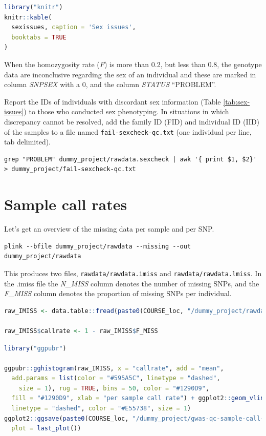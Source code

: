 \documentclass[
]{book}
\newcommand{\passthrough}[1]{#1}
\begin{document}
\begin{lstlisting}[language=R]
library("knitr")
knitr::kable(
  sexissues, caption = 'Sex issues',
  booktabs = TRUE
)
\end{lstlisting}

When the homozygosity rate (\emph{F}) is more than 0.2, but less than 0.8, the genotype data are inconclusive regarding the sex of an individual and these are marked in column \emph{SNPSEX} with a 0, and the column \emph{STATUS} ``PROBLEM''.

Report the IDs of individuals with discordant sex information (Table \ref{tab:sex-issues}) to those who conducted sex phenotyping. In situations in which discrepancy cannot be resolved, add the family ID (FID) and individual ID (IID) of the samples to a file named \passthrough{\lstinline!fail-sexcheck-qc.txt!} (one individual per line, tab delimited).

\begin{lstlisting}
grep "PROBLEM" dummy_project/rawdata.sexcheck | awk '{ print $1, $2}'  > dummy_project/fail-sexcheck-qc.txt
\end{lstlisting}

\hypertarget{sample-call-rates}{%
\section{Sample call rates}\label{sample-call-rates}}

Let's get an overview of the missing data per sample and per SNP.

\begin{lstlisting}
plink --bfile dummy_project/rawdata --missing --out dummy_project/rawdata
\end{lstlisting}

This produces two files, \passthrough{\lstinline!rawdata/rawdata.imiss!} and \passthrough{\lstinline!rawdata/rawdata.lmiss!}. In the .imiss file the \emph{N\_MISS} column denotes the number of missing SNPs, and the \emph{F\_MISS} column denotes the proportion of missing SNPs per individual.

\begin{lstlisting}[language=R]
raw_IMISS <- data.table::fread(paste0(COURSE_loc, "/dummy_project/rawdata.imiss"))

raw_IMISS$callrate <- 1 - raw_IMISS$F_MISS
\end{lstlisting}

\begin{lstlisting}[language=R]
library("ggpubr")

ggpubr::gghistogram(raw_IMISS, x = "callrate", add = "mean",
  add.params = list(color = "#595A5C", linetype = "dashed",
    size = 1), rug = TRUE, bins = 50, color = "#1290D9",
  fill = "#1290D9", xlab = "per sample call rate") + ggplot2::geom_vline(xintercept = 0.95,
  linetype = "dashed", color = "#E55738", size = 1)
ggplot2::ggsave(paste0(COURSE_loc, "/dummy_project/gwas-qc-sample-call-rate.png"),
  plot = last_plot())
\end{lstlisting}
\end{document}
